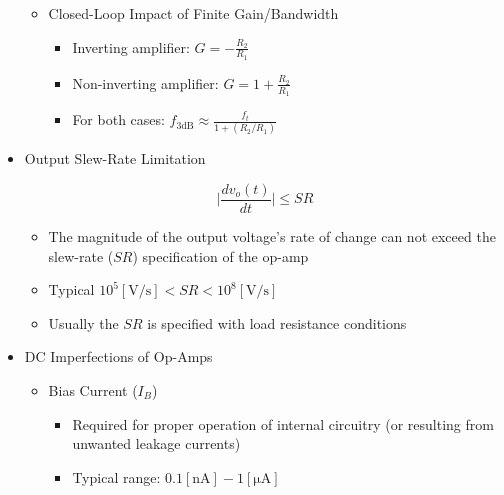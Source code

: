 \begin{itemize}
\begin{itemize}
      \item Closed-Loop Impact of Finite Gain/Bandwidth

        \begin{itemize}

          \item Inverting amplifier: $G=-\frac{R_2}{R_1}$

          \item Non-inverting amplifier: $G=1+\frac{R_2}{R_1}$

          \item For both cases: $f_{3\text{dB}}\approx\frac{f_t}{1+(R_2/R_1)}$

        \end{itemize}

    \end{itemize}

  \item Output Slew-Rate Limitation

    $$\Big|\frac{dv_o(t)}{dt}\Big|\leq SR$$

    \begin{itemize}

      \item The magnitude of the output voltage's rate of change can not exceed the slew-rate ($SR$) specification of the op-amp

      \item Typical $10^5[\si{\volt}/\si{\second}]<SR<10^8[\si{\volt}/\si{\second}]$

      \item Usually the $SR$ is specified with load resistance conditions

    \end{itemize}

  \item DC Imperfections of Op-Amps

    \begin{itemize}

      \item Bias Current ($I_B$)

        \begin{itemize}

          \item Required for proper operation of internal circuitry (or resulting from unwanted leakage currents)

          \item Typical range: $0.1[\si{\nano\ampere}]-1[\si{\micro\ampere}]$


\end{itemize}
\end{itemize}
\end{itemize}
